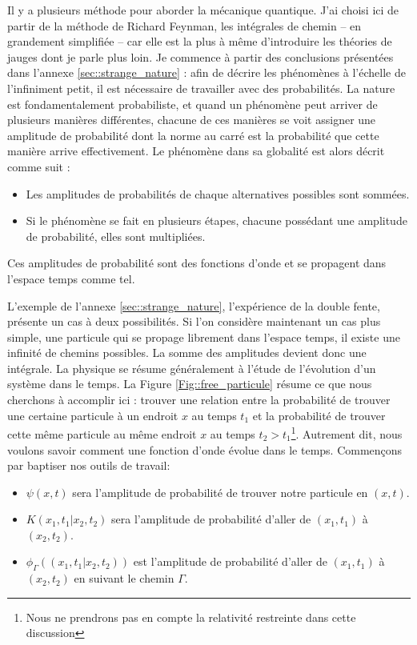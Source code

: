             Il y a plusieurs méthode pour aborder la mécanique quantique. J'ai choisi ici de partir de la méthode de Richard Feynman, les intégrales de chemin -- en grandement simplifiée -- car elle est la plus à même d'introduire les théories de jauges dont je parle plus loin. Je commence à partir des conclusions présentées dans l'annexe \ref{sec::strange_nature} : afin de décrire les phénomènes à l'échelle de l'infiniment petit, il est nécessaire de travailler avec des probabilités. La nature est fondamentalement probabiliste, et quand un phénomène peut arriver de plusieurs manières différentes, chacune de ces manières se voit assigner une amplitude de probabilité dont la norme au carré est la probabilité que cette manière arrive effectivement. Le phénomène dans sa globalité est alors décrit comme suit : 
            \begin{itemize}
                \item Les amplitudes de probabilités de chaque alternatives possibles sont sommées.
                \item Si le phénomène se fait en plusieurs étapes, chacune possédant une amplitude de probabilité, elles sont multipliées.
            \end{itemize}
            Ces amplitudes de probabilité sont des fonctions d'onde et se propagent dans l'espace temps comme tel.
                
            L'exemple de l'annexe \ref{sec::strange_nature}, l'expérience de la double fente, présente un cas à deux possibilités. Si l'on considère maintenant un cas plus simple, une particule qui se propage librement dans l'espace temps, il existe une infinité de chemins possibles. La somme des amplitudes devient donc une intégrale. La physique se résume généralement à l'étude de l'évolution d'un système dans le temps. La Figure \ref{Fig::free_particule} résume ce que nous cherchons à accomplir ici : trouver une relation entre la probabilité de trouver une certaine particule à un endroit $x$ au temps $t_1$ et la probabilité de trouver cette même particule au même endroit $x$ au temps $t_2>t_1$\footnote{Nous ne prendrons pas en compte la relativité restreinte dans cette discussion}. Autrement dit, nous voulons savoir comment une fonction d'onde évolue dans le temps. Commençons par baptiser nos outils de travail: 
            \begin{itemize}
                \item $\psi(x,t)$ sera l'amplitude de probabilité de trouver notre particule en $(x,t)$.
                \item $K(x_1,t_1|x_2,t_2)$ sera l'amplitude de probabilité d'aller de $(x_1,t_1)$ à $(x_2,t_2)$.
                \item $\phi_{\Gamma}((x_1,t_1|x_2,t_2))$ est l'amplitude de probabilité d'aller de $(x_1,t_1)$ à $(x_2,t_2)$ en suivant le chemin $\Gamma$.
            \end{itemize}
                

